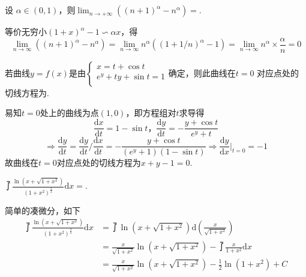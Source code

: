 \documentclass[hideanswer=false,
enfont=newtxtext,
zhfont=empty,
mathfont=newtxmath,
]{CMCThesis}
\begin{document}

\addvspace{1\bigskipamount}

\\\\
\wq 设 $\alpha\in\left(0,1\right)$，则$ \lim_{n\rightarrow +\infty}\left(\left(n+1\right)^{\alpha}-n^{\alpha}\right)=$\underline{\hspace{3em}}.\\
	\begin{answer}
	\begin{solution}
等价无穷小$\left(1+x\right)^{\alpha}-1\backsim\alpha x$，得
		\[
		\lim_{n\rightarrow\infty}\left(\left(n+1\right)^{\alpha}-n^{\alpha}\right)=\lim_{n\rightarrow\infty}n^{\alpha}\left(\left(1+1/n\right)^{\alpha}-1\right)=\lim_{n\rightarrow\infty}n^{\alpha}\times\frac{\alpha}{n}=0
		\]
	\end{solution}
	\end{answer}
\wq $\textrm{若曲线}y=f\left(x\right)\textrm{是由}\left\{\begin{array}{l}
x=t+\cos t\\
e^y+ty+\sin t=1\\
\end{array}\right.\textrm{确定，则此曲线在}t=0$ 对应点处的\\
切线方程为\underline{\hspace{3em}}.\\
	\begin{answer}
	\begin{solution}
易知$t=0$处上的曲线为点$(1,0)$，即方程组对$t$求导得
\[
\frac{\mathrm{d}x}{\mathrm{d}t}=1-\sin t\textbf{，}\frac{\mathrm{d}y}{\mathrm{d}t}=-\frac{y+\cos t}{e^y+t}
\]
\[
\Rightarrow\frac{\mathrm{d}y}{\mathrm{d}t}=\frac{\mathrm{d}y}{\mathrm{d}t}/\frac{\mathrm{d}x}{\mathrm{d}t}=-\frac{y+\cos t}{\left(e^y+1\right)\left(1-\sin t\right)}\Rightarrow\frac{\mathrm{d}y}{\mathrm{d}x}|_{t=0}=-1
\]
故曲线在$t=0$对应点处的切线方程为$x+y-1=0$.
	\end{solution}
	\end{answer}

\wq $\upint{\frac{\ln\left(x+\sqrt{1+x^2}\right)}{\left(1+x^2\right)^{\frac{3}{2}}}}\mathrm{d}x=$\underline{\hspace{3em}}.\\
	\begin{answer}
	\begin{solution}
简单的凑微分，如下
\begin{align*}
\upint{\frac{\ln\left(x+\sqrt{1+x^2}\right)}{\left(1+x^2\right)^{\frac{3}{2}}}}\mathrm{d}x&=\upint{\ln\left(x+\sqrt{1+x^2}\right)}\mathrm{d}\left(\frac{x}{\sqrt{1+x^2}}\right)\\
&=\frac{x}{\sqrt{1+x^2}}\ln\left(x+\sqrt{1+x^2}\right)-\upint{\frac{x}{1+x^2}\mathrm{d}x}\\
&=\frac{x}{\sqrt{1+x^2}}\ln\left(x+\sqrt{1+x^2}\right)-\frac{1}{2}\ln\left(1+x^2\right)+C
\end{align*}
	\end{solution}
	\end{answer}
\end{document}
